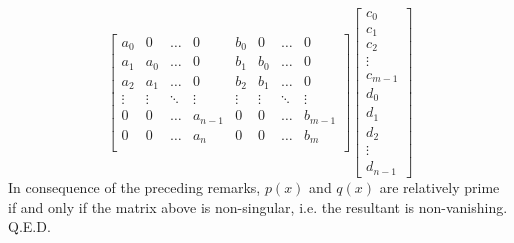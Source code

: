 \documentclass[12pt]{article}
\begin{document}
$$\begin{bmatrix}
    a_0 & 0 &  \ldots &  0 & b_0 & 0 & \ldots & 0 \\
    a_1 & a_0  & \ldots & 0 & b_1 & b_0 & \ldots & 0 \\
    a_2 & a_1 & \ldots  & 0 & b_2 & b_1 & \ldots & 0\\
    \vdots & \vdots  & \ddots & \vdots  &\vdots  &\vdots 
    &\ddots & \vdots \\
    0 & 0 &  \ldots  & a_{n-1} & 0 & 0 &\ldots & b_{m-1} \\
    0 & 0 &  \ldots  & a_n & 0 & 0 &\ldots & b_m \\
  \end{bmatrix}
  \begin{bmatrix}
    c_0 \\ c_1 \\ c_2 \\ \vdots \\ c_{m-1} \\ d_0 \\ d_1 \\ d_2 \\
    \vdots \\ d_{n-1}
  \end{bmatrix}
$$
In consequence of the preceding remarks, $p(x)$ and $q(x)$ are
relatively prime if and only if the matrix above is non-singular,
i.e. the resultant is non-vanishing.  Q.E.D.
\end{document}

